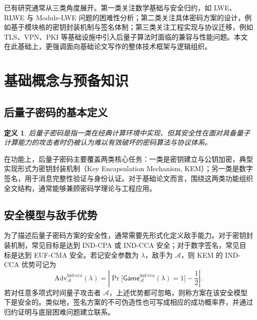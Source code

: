 ﻿\documentclass[12pt,a4paper]{ctexart}
\numberwithin{equation}{section}
\newtheorem{definition}[theorem]{定义}
\newcommand{\adv}{\mathrm{Adv}}
\begin{document}
已有研究通常从三类角度展开。第一类关注数学基础与安全归约，如 LWE、RLWE 与 Module-LWE 问题的困难性分析；第二类关注具体密码方案的设计，例如基于模块格的密钥封装机制与签名体制；第三类关注工程实现与协议迁移，例如 TLS、VPN、PKI 等基础设施中引入后量子算法时面临的兼容与性能问题。本文在此基础上，更强调面向基础论文写作的整体技术框架与逻辑组织。

\section{基础概念与预备知识}
\subsection{后量子密码的基本定义}
\begin{definition}
后量子密码是指一类在经典计算环境中实现、但其安全性在面对具备量子计算能力的攻击者时仍被认为难以有效破坏的密码算法与协议体系。
\end{definition}

在功能上，后量子密码主要覆盖两类核心任务：一类是密钥建立与公钥加密，典型实现形式为密钥封装机制（Key Encapsulation Mechanism, KEM）；另一类是数字签名，用于消息完整性验证与身份认证。对于基础论文而言，围绕这两类功能组织全文结构，通常能够兼顾密码学理论与工程应用。

\subsection{安全模型与敌手优势}
为了描述后量子密码方案的安全性，通常需要先形式化定义敌手能力。对于密钥封装机制，常见目标是达到 IND-CPA 或 IND-CCA 安全；对于数字签名，常见目标是达到 EUF-CMA 安全。若记安全参数为 $\lambda$，敌手为 $\mathcal{A}$，则 KEM 的 IND-CCA 优势可记为
\begin{equation}
    \adv^{\mathrm{ind\mbox{-}cca}}_{\mathcal{A}}(\lambda)
    =
    \left|
    \Pr\bigl[\mathsf{Game}^{\mathrm{ind\mbox{-}cca}}_{\mathcal{A}}(\lambda)=1\bigr]
    - \frac{1}{2}
    \right|.
\end{equation}
若对任意多项式时间量子攻击者 $\mathcal{A}$，上述优势都可忽略，则称方案在该安全模型下是安全的。类似地，签名方案的不可伪造性也可写成相应的成功概率界，并通过归约证明与底层困难问题建立联系。
\end{document}
